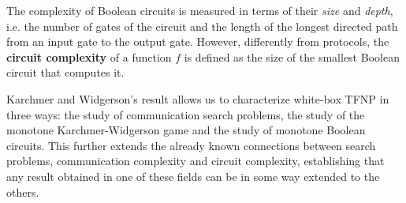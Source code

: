The complexity of Boolean circuits is measured in terms of their \textit{size} and \textit{depth}, i.e. the number of gates of the circuit and the length of the longest directed path from an input gate to the output gate. However, differently from protocols, the \textbf{circuit complexity} of a function $f$ is defined as the size of the smallest Boolean circuit that computes it.

Karchmer and Widgerson's result allows us to characterize white-box \textsf{TFNP} in three ways: the study of communication search problems, the study of the monotone Karchmer-Widgerson game and the study of monotone Boolean circuits. This further extends the already known connections between search problems, communication complexity and circuit complexity, establishing that any result obtained in one of these fields can be in some way extended to the others.


\cleardoublepage